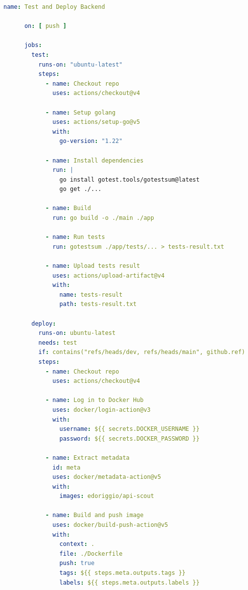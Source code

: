 \begin{center}
    \lstset{
        numbers=left,
        firstnumber=1
    }

    \begin{lstlisting}[language=yaml,caption={YML file containing the CI/CD pipeline},label={lst:ci-cd-pipeline},captionpos=b]
      name: Test and Deploy Backend

      on: [ push ]

      jobs:
        test:
          runs-on: "ubuntu-latest"
          steps:
            - name: Checkout repo
              uses: actions/checkout@v4

            - name: Setup golang
              uses: actions/setup-go@v5
              with:
                go-version: "1.22"

            - name: Install dependencies
              run: |
                go install gotest.tools/gotestsum@latest
                go get ./...

            - name: Build
              run: go build -o ./main ./app

            - name: Run tests
              run: gotestsum ./app/tests/... > tests-result.txt

            - name: Upload tests result
              uses: actions/upload-artifact@v4
              with:
                name: tests-result
                path: tests-result.txt

        deploy:
          runs-on: ubuntu-latest
          needs: test
          if: contains("refs/heads/dev, refs/heads/main", github.ref)
          steps:
            - name: Checkout repo
              uses: actions/checkout@v4

            - name: Log in to Docker Hub
              uses: docker/login-action@v3
              with:
                username: ${{ secrets.DOCKER_USERNAME }}
                password: ${{ secrets.DOCKER_PASSWORD }}

            - name: Extract metadata
              id: meta
              uses: docker/metadata-action@v5
              with:
                images: edoriggio/api-scout

            - name: Build and push image
              uses: docker/build-push-action@v5
              with:
                context: .
                file: ./Dockerfile
                push: true
                tags: ${{ steps.meta.outputs.tags }}
                labels: ${{ steps.meta.outputs.labels }}
    \end{lstlisting}
\end{center}

